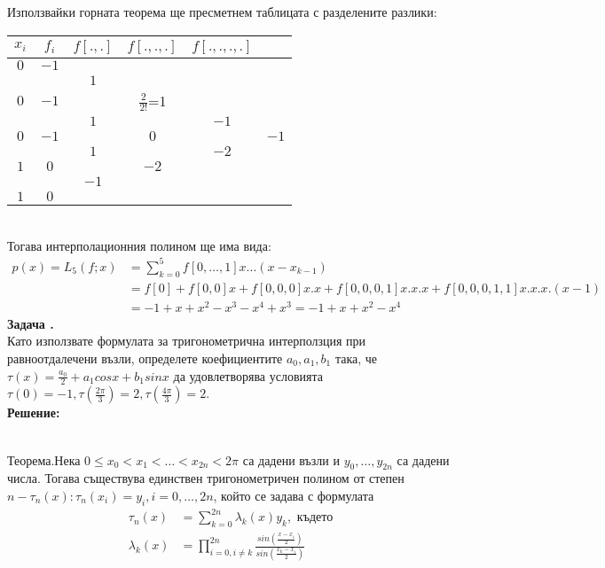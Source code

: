 \documentclass[12pt]{article}
\newcounter{problem}
\newcounter{solution}
\newcommand\problem{%
  \stepcounter{problem}%
  \textbf{Задача \theproblem.}~%
  \\
}
\newcommand\solution{%
  \textbf{Решение:}\\~%
}
\begin{document}
Използвайки горната теорема ще пресметнем таблицата с разделените разлики:
\begin{tabular}{|c c c c c c|}
\hline
$x_i$&$f_i$&$f[.,.]$&$f[.,.,.]$&$f[.,.,.,.]$\\
\hline
$0$ & $-1$ &      &                  &      &\\
    &      & $1$  &                  &      &\\
$0$ & $-1$ &      & $\frac{2}{2!}$=1 &      &\\
    &      & $1$  &                  & $-1$ &\\
$0$ & $-1$ &      & $0$              &      & $-1$\\
    &      & $1$  &                  & $-2$ &\\
$1$ & $0$  &      & $-2$             &      &\\
    &      & $-1$ &                  &      &\\
$1$ & $0$  &      &                  &      &\\
\hline
\end{tabular}\\
Тогава интерполационния полином ще има вида:
\begin{align*}
p(x)=L_5(f;x) &= \sum_{k=0}^5f[0,\dotso,1]x\dotso(x-x_{k-1})\\
&= f[0] + f[0,0]x+f[0,0,0]x.x+f[0,0,0,1]x.x.x+f[0,0,0,1,1]x.x.x.(x-1)\\
&= -1 + x+ x^2 -x^3 -x^4 +x^3 = \boxed{-1 +x +x^2 -x^4}
\end{align*}
\problem
Като използвате формулата за тригонометрична интерползция при равноотдалечени възли, определете коефициентите $a_0, a_1, b_1$ така, че $\tau(x)= \frac{a_0}{2}+a_1cosx+b_1sinx$ да удовлетворява условията $\tau(0)=-1, \tau(\frac{2\pi}{3})=2,\tau(\frac{4\pi}{3})=2$.\\
\solution
\begin{tcolorbox}[colback=red!5!white,colframe=red!75!black]
Теорема.Нека $0\leq x_0<x_1<\ldots<x_{2n}<2\pi$ са дадени възли и $y_0,\ldots,y_{2n}$ са дадени числа. Тогава съществува единствен тригонометричен полином от степен $n - \tau_n(x):\tau_n(x_i)=y_i,i=0,\ldots,2n$, който се задава с формулата
\begin{align*}
\tau_n(x)&=\sum_{k=0}^{2n}\lambda_k(x)y_k,\text{ където}\\
\lambda_k(x)&=\prod_{i=0,i\neq k}^{2n}\frac{sin\left(\frac{x-x_i}{2}\right)}{sin\left(\frac{x_k-x_i}{2}\right)}
\end{align*}
\end{tcolorbox}
\end{document}
